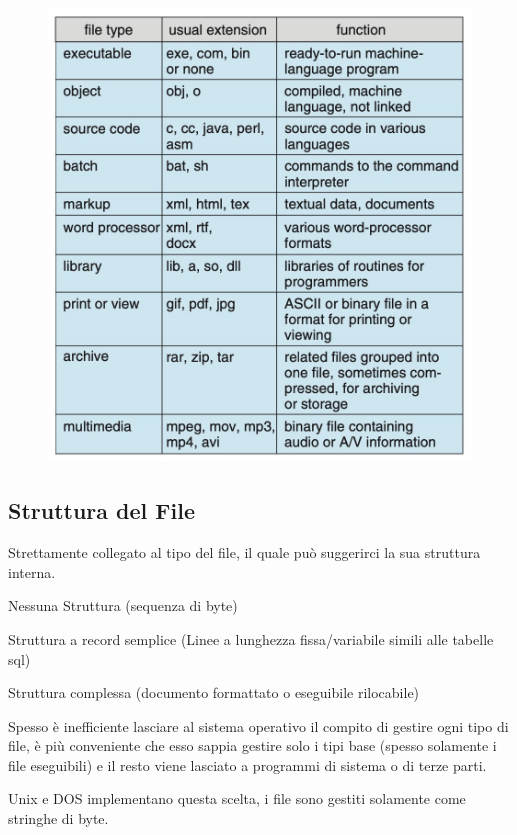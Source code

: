 \begin{figure}[H]
    \centering
    \includegraphics[width=0.5\linewidth]{assets/tipi-file.jpg}
\end{figure}

\subsection{Struttura del File}
Strettamente collegato al tipo del file, il quale può suggerirci la sua struttura interna.
\begin{sitemize}
    \item Nessuna Struttura (sequenza di byte)
    \item Struttura a record semplice (Linee a lunghezza fissa/variabile simili alle tabelle sql)
    \item Struttura complessa (documento formattato o eseguibile rilocabile)
\end{sitemize}

\spacer
Spesso è inefficiente lasciare al sistema operativo il compito di gestire ogni tipo di file, è più conveniente che esso sappia gestire solo i tipi base (spesso solamente i file eseguibili) e il resto viene lasciato a programmi di sistema o di terze parti.

Unix e DOS implementano questa scelta, i file sono gestiti solamente come stringhe di byte.

